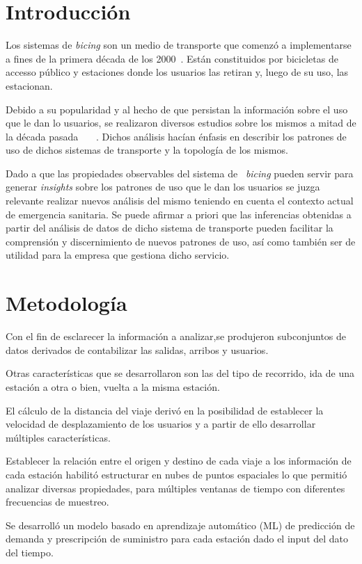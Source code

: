 \documentclass[runningheads,a4paper,spanish]{llncs}
\begin{document}
\section{Introducción}

Los sistemas de \textit{bicing} son un medio de transporte que comenzó a implementarse a
fines de la primera década de los 2000~\cite{demaio2009bike}. Están
constituidos por bicicletas de accesso público y estaciones donde los usuarios
las retiran y, luego de su uso, las estacionan.

Debido a su popularidad y al hecho de que persistan la información sobre el uso
que le dan lo usuarios, se realizaron diversos estudios sobre los mismos a
mitad de la década pasada~\cite{OBrien2014}~\cite{jensen2010characterizing}
~\cite{lathia2012measuring}. Dichos análisis hacían énfasis en describir los
patrones de uso de dichos sistemas de transporte y la topología de los mismos. 

Dado a que las propiedades observables del sistema de ~\textit{bicing} pueden
servir para generar \textit{insights} sobre los patrones de uso que le dan los
usuarios se juzga relevante realizar nuevos análisis del mismo teniendo en
cuenta el contexto actual de emergencia sanitaria. Se puede afirmar a priori
que las inferencias obtenidas a partir del análisis de datos de dicho sistema
de transporte pueden facilitar la comprensión y discernimiento de nuevos
patrones de uso, así como también ser de utilidad para la empresa que gestiona
dicho servicio.

\section{Metodología}

Con el fin de esclarecer la información a analizar,se produjeron subconjuntos de
datos derivados de contabilizar las salidas, arribos y usuarios.  

Otras características que se desarrollaron son las del tipo de recorrido, ida
de una estación a otra o bien, vuelta a la misma estación. 

El cálculo de la distancia del viaje derivó en la posibilidad de establecer la
velocidad de desplazamiento de los usuarios y a partir de ello desarrollar
múltiples características.

Establecer la relación entre el origen y destino de cada viaje a los
información de cada estación habilitó estructurar en nubes de puntos espaciales
lo que permitió analizar diversas propiedades, para múltiples ventanas de
tiempo con diferentes frecuencias de muestreo.  

Se desarrolló un modelo basado en aprendizaje automático (ML) de predicción de
demanda y prescripción de suministro para cada estación dado el input del dato
del tiempo.



\newpage


\end{document}
